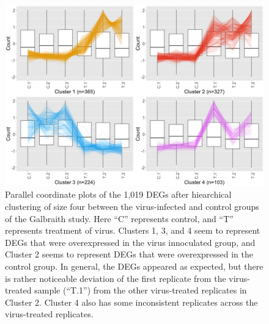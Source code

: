 \documentclass[11pt,a4paper,oldfontcommands,openany]{memoir}
\numberwithin{equation}{section} %
\begin{document}
\begin{figure}[H]
\centering
\begin{framed}
  \includegraphics[width=\textwidth]{Images/C_T_4.jpg}
  \end{framed}
  \caption{Parallel coordinate plots of the 1,019 DEGs after hiearchical clustering of size four between the virus-infected and control groups of the Galbraith study. Here ``C'' represents control, and ``T'' represents treatment of virus. Clusters 1, 3, and 4 seem to represent DEGs that were overexpressed in the virus innoculated group, and Cluster 2 seems to represent DEGs that were overexpressed in the control group. In general, the DEGs appeared as expected, but there is rather noticeable deviation of the first replicate from the virus-treated sample (``T.1'') from the other virus-treated replicates in Cluster 2. Cluster 4 also has some inconsistent replicates across the virus-treated replicates.}
  \label{fig:pcpGalbraith}
\end{figure}
\end{document}
